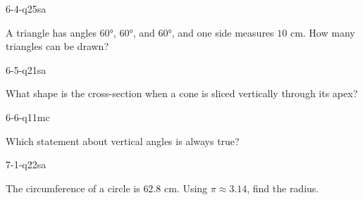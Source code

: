 \begin{practiceQuestion}{6-4-q25}{sa}
\begin{questionText}
A triangle has angles $60°$, $60°$, and $60°$, and one side measures $10$ cm. How many triangles can be drawn?
\end{questionText}
\end{practiceQuestion}

\begin{practiceQuestion}{6-5-q21}{sa}
\begin{questionText}
What shape is the cross-section when a cone is sliced vertically through its apex?
\end{questionText}
\end{practiceQuestion}

\begin{practiceQuestion}{6-6-q11}{mc}
\begin{questionText}
Which statement about vertical angles is always true?
\end{questionText}
\end{practiceQuestion}

\begin{practiceQuestion}{7-1-q22}{sa}
\begin{questionText}
The circumference of a circle is $62.8$ cm. Using $\pi \approx 3.14$, find the radius.
\end{questionText}
\end{practiceQuestion}

